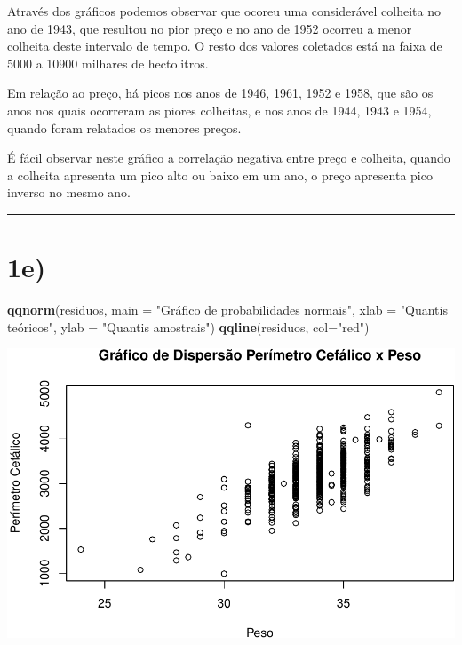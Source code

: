 \documentclass[11pt,]{article}
\makeatletter
\newenvironment{Shaded}{\begin{snugshade}}{\end{snugshade}}
\newcommand{\KeywordTok}[1]{\textcolor[rgb]{0.13,0.29,0.53}{\textbf{{#1}}}}
\newcommand{\DataTypeTok}[1]{\textcolor[rgb]{0.13,0.29,0.53}{{#1}}}
\newcommand{\StringTok}[1]{\textcolor[rgb]{0.31,0.60,0.02}{{#1}}}
\newcommand{\NormalTok}[1]{{#1}}
\def\maxwidth{\ifdim\Gin@nat@width>\linewidth\linewidth
\else\Gin@nat@width\fi}
\let\Oldincludegraphics\includegraphics
\renewcommand{\includegraphics}[1]{\Oldincludegraphics[width=\maxwidth]{#1}}
\makeatother
\begin{document}
Através dos gráficos podemos observar que ocoreu uma considerável
colheita no ano de 1943, que resultou no pior preço e no ano de 1952
ocorreu a menor colheita deste intervalo de tempo. O resto dos valores
coletados está na faixa de 5000 a 10900 milhares de hectolitros.

Em relação ao preço, há picos nos anos de 1946, 1961, 1952 e 1958, que
são os anos nos quais ocorreram as piores colheitas, e nos anos de 1944,
1943 e 1954, quando foram relatados os menores preços.

É fácil observar neste gráfico a correlação negativa entre preço e
colheita, quando a colheita apresenta um pico alto ou baixo em um ano, o
preço apresenta pico inverso no mesmo ano.

\begin{center}\rule{0.5\linewidth}{\linethickness}\end{center}

\section{1e)}\label{e}

\begin{Shaded}
\begin{Highlighting}[]
\KeywordTok{qqnorm}\NormalTok{(residuos, }
       \DataTypeTok{main =} \StringTok{"Gráfico de probabilidades normais"}\NormalTok{, }
       \DataTypeTok{xlab =} \StringTok{"Quantis teóricos"}\NormalTok{, }
       \DataTypeTok{ylab =} \StringTok{"Quantis amostrais"}\NormalTok{)}
\KeywordTok{qqline}\NormalTok{(residuos, }\DataTypeTok{col=}\StringTok{"red"}\NormalTok{)}
\end{Highlighting}
\end{Shaded}

\includegraphics{versaofinal_lista3_files/figure-latex/unnamed-chunk-7-1.pdf}
\end{document}
